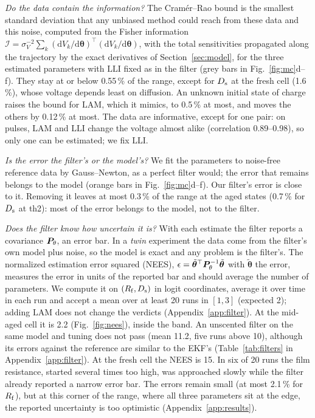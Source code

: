 \documentclass[journal]{IEEEtran}
\newcommand{\vth}{\bm{\theta}}\newcommand{\vF}{\bm{F}}\newcommand{\mA}{\bm{A}}\newcommand{\mB}{\bm{B}}
\newcommand{\LAM}{\mathrm{LAM}}\newcommand{\LLI}{\mathrm{LLI}}\newcommand{\phipl}{\phi_{\mathrm{pl}}}
\begin{document}
\emph{Do the data contain the information?} The Cram\'er--Rao bound is the smallest standard deviation that any unbiased method could reach from these data and this noise, computed from the Fisher information $\mathcal I=\sigma_V^{-2}\sum_k(\mathrm{d}V_k/\mathrm{d}\vth)^{\top}(\mathrm{d}V_k/\mathrm{d}\vth)$, with the total sensitivities propagated along the trajectory by the exact derivatives of Section~\ref{sec:model}, for the three estimated parameters with $\LLI$ fixed as in the filter (grey bars in Fig.~\ref{fig:mc}d--f). They stay at or below 0.55\,\% of the range, except for $D_{\mathrm{s}}$ at the fresh cell (1.6\,\%), whose voltage depends least on diffusion. An unknown initial state of charge raises the bound for $\LAM$, which it mimics, to 0.5\,\% at most, and moves the others by 0.12\,\% at most. The data are informative, except for one pair: on pulses, $\LAM$ and $\LLI$ change the voltage almost alike (correlation 0.89--0.98), so only one can be estimated; we fix $\LLI$.

\emph{Is the error the filter's or the model's?} We fit the parameters to noise-free reference data by Gauss--Newton, as a perfect filter would; the error that remains belongs to the model (orange bars in Fig.~\ref{fig:mc}d--f). Our filter's error is close to it. Removing it leaves at most 0.3\,\% of the range at the aged states (0.7\,\% for $D_{\mathrm{s}}$ at th2): most of the error belongs to the model, not to the filter.

\emph{Does the filter know how uncertain it is?} With each estimate the filter reports a covariance $\bm{P}_\theta$, an error bar. In a \emph{twin} experiment the data come from the filter's own model plus noise, so the model is exact and any problem is the filter's. The normalized estimation error squared (NEES)\cite{barshalom2001}, $\epsilon=\tilde{\vth}^{\top}\mP_{\theta}^{-1}\tilde{\vth}$ with $\tilde{\vth}$ the error, measures the error in units of the reported bar and should average the number of parameters. We compute it on $(R_{\mathrm{f}},D_{\mathrm{s}})$ in logit coordinates, average it over time in each run and accept a mean over at least 20 runs in $[1,3]$ (expected 2); adding $\LAM$ does not change the verdicts (Appendix~\ref{app:filter}). At the mid-aged cell it is 2.2 (Fig.~\ref{fig:nees}), inside the band. An unscented filter on the same model and tuning does not pass (mean 11.2, five runs above 10), although its errors against the reference are similar to the EKF's (Table~\ref{tab:filters} in Appendix~\ref{app:filter}). At the fresh cell the NEES is 15. In six of 20 runs the film resistance, started several times too high, was approached slowly while the filter already reported a narrow error bar. The errors remain small (at most 2.1\,\% for $R_{\mathrm{f}}$), but at this corner of the range, where all three parameters sit at the edge, the reported uncertainty is too optimistic (Appendix~\ref{app:results}).
\end{document}
